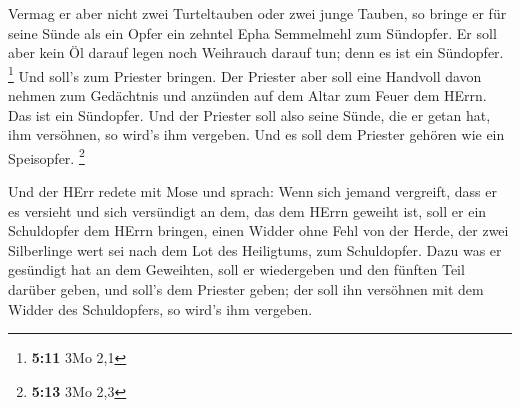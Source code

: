  Vermag er aber nicht zwei Turteltauben oder zwei junge
Tauben, so bringe er für seine Sünde als ein Opfer ein zehntel Epha
Semmelmehl zum Sündopfer. Er soll aber kein Öl darauf legen noch
Weihrauch darauf tun; denn es ist ein Sündopfer. \footnote{\textbf{5:11}
  3Mo 2,1}  Und soll's zum Priester bringen. Der Priester
aber soll eine Handvoll davon nehmen zum Gedächtnis und anzünden auf dem
Altar zum Feuer dem HErrn. Das ist ein Sündopfer.  Und der
Priester soll also seine Sünde, die er getan hat, ihm versöhnen, so
wird's ihm vergeben. Und es soll dem Priester gehören wie ein
Speisopfer. \footnote{\textbf{5:13} 3Mo 2,3}

 Und der HErr redete mit Mose und sprach: 
Wenn sich jemand vergreift, dass er es versieht und sich versündigt an
dem, das dem HErrn geweiht ist, soll er ein Schuldopfer dem HErrn
bringen, einen Widder ohne Fehl von der Herde, der zwei Silberlinge wert
sei nach dem Lot des Heiligtums, zum Schuldopfer.  Dazu was
er gesündigt hat an dem Geweihten, soll er wiedergeben und den fünften
Teil darüber geben, und soll's dem Priester geben; der soll ihn
versöhnen mit dem Widder des Schuldopfers, so wird's ihm vergeben.

